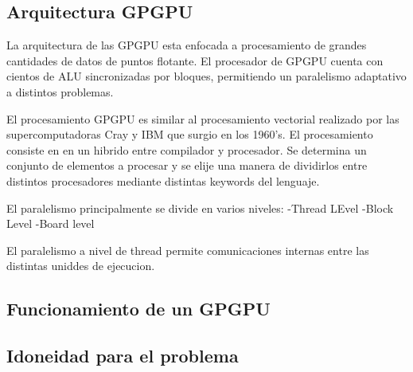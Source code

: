 \subsection{Arquitectura GPGPU}
La arquitectura de las GPGPU esta enfocada a procesamiento de grandes cantidades de datos
de puntos flotante. El procesador de GPGPU cuenta con cientos de ALU sincronizadas
por bloques, permitiendo un paralelismo adaptativo a distintos problemas.

El procesamiento GPGPU es similar al procesamiento vectorial 
realizado por las supercomputadoras Cray y IBM que surgio en los 1960's.
El procesamiento consiste en en un hibrido entre compilador y procesador. Se determina
un conjunto de elementos a procesar y se elije una manera de dividirlos entre distintos
procesadores mediante distintas keywords del lenguaje. 

El paralelismo principalmente se divide en varios niveles:
-Thread LEvel
-Block Level
-Board level

El paralelismo a nivel de thread permite comunicaciones internas entre las
distintas uniddes de ejecucion.


\subsection{Funcionamiento de un GPGPU}

\subsection{Idoneidad para el problema}
